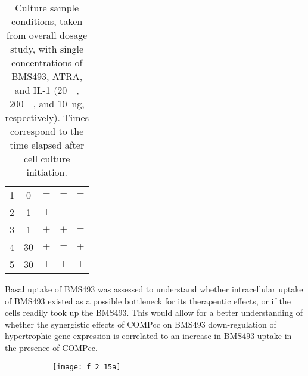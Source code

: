 \begin{refsection}
\begin{table}[h!]
\begin{tabular}{ ccccc }
  1 & 0 & ${-}$ & ${-}$ & ${-}$ \\
  2 & 1 & ${+}$ & ${-}$ & ${-}$ \\
  3 & 1 & ${+}$ & ${+}$ & ${-}$ \\
  4 & 30 & ${+}$ & ${-}$ & ${+}$ \\
  5 & 30 & ${+}$ & ${+}$ & ${+}$ \\

  \hline
\end{tabular}
\caption[Culture sample conditions]{Culture sample conditions, taken from
overall dosage study, with single concentrations of BMS493, ATRA, and IL-1
(\SI{20}{\micro\moLar}, \SI{200}{\nano\moLar}, and \SI{10}{\ng},
respectively). Times correspond to the time elapsed after cell culture
initiation.}
\label{tab:culture_extracts_table}
\end{table}
Basal uptake of BMS493 was assessed to understand whether
intracellular uptake of BMS493 existed as a possible bottleneck for its
therapeutic effects, or if the cells readily took up the BMS493. This would
allow for a better understanding of whether the synergistic effects of COMPcc on
BMS493 down-regulation of hypertrophic gene expression is correlated to an
increase in BMS493 uptake in the presence of COMPcc.
\begin{figure}[h!]
    \centering
    \begin{subfigure}[b]{0.8\textwidth}
        \texttt{[image: f\_2\_15a]}
        \caption{}
        \label{fig:culture_extracts_chrom}
    \end{subfigure}


\end{figure}
\end{refsection}
